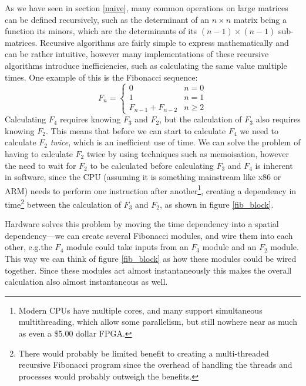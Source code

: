 \documentclass[12pt]{article}
\begin{document}
As we have seen in section \ref{naive}, many common operations on large matrices can be defined recursively, such as the determinant of an $n \times n$ matrix being a function its minors, which are the determinants of its $(n-1) \times (n-1)$ sub-matrices. Recursive algorithms are fairly simple to express mathematically and can be rather intuitive, however many implementations of these recursive algorithms introduce inefficiencies, such as calculating the same value multiple times. One example of this is the Fibonacci sequence:
\begin{equation}
	F_n = 
	\begin{cases}
		0 & n = 0\\
		1 & n = 1 \\
		F_{n-1} + F_{n-2} & n \ge 2
	\end{cases}
\end{equation}
Calculating $F_4$ requires knowing $F_3$ and $F_2$, but the calculation of $F_3$ also requires knowing $F_2$. This means that before we can start to calculate $F_4$ we need to calculate $F_2$ \emph{twice}, which is an inefficient use of time. We can solve the problem of having to calculate $F_2$ twice by using techniques such as memoisation, however the need to wait for $F_2$ to be calculated before calculating $F_3$ and $F_4$ is inherent in software, since the CPU (assuming it is something mainstream like x86 or ARM) needs to perform one instruction after another\footnote{Modern CPUs have multiple cores, and many support simultaneous multithreading, which allow some parallelism, but still nowhere near as much as even a \$5.00 dollar FPGA.}, creating a dependency in time\footnote{There would probably be limited benefit to creating a multi-threaded recursive Fibonacci program since the overhead of handling the threads and processes would probably outweigh the benefits.} between the calculation of $F_3$ and $F_2$, as shown in figure \ref{fib_block}.

Hardware solves this problem by moving the time dependency into a spatial dependency---we can create several Fibonacci modules, and wire them into each other, e.g.\@ the $F_4$ module could take inputs from an $F_3$ module and an $F_2$ module. This way we can think of figure \ref{fib_block} as how these modules could be wired together. Since these modules act almost instantaneously this makes the overall calculation also almost instantaneous as well.
\end{document}
